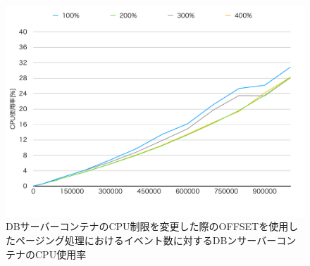 \documentclass[../../../../../main]{subfiles}
\begin{document}
    \begin{figure}[H]
        \centering
        \includegraphics[width=12cm]{graph}
        \caption{DBサーバーコンテナのCPU制限を変更した際のOFFSETを使用したページング処理におけるイベント数に対するDBンサーバーコンテナのCPU使用率}
        \label{fig:paging-offset-change-db-cpu-limit-db-cpu-app_4_8192-db_1024}
    \end{figure}
\end{document}

